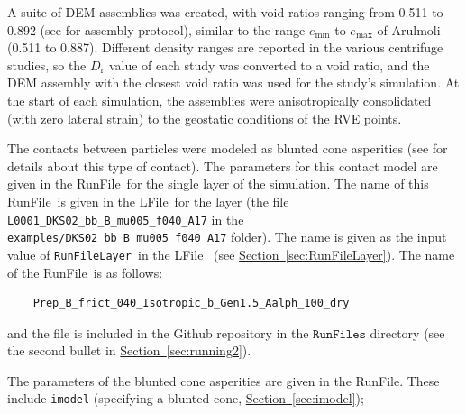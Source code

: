 \documentclass[letterpaper,11pt]{article}
\newcommand{\RunFile}{\textsf{RunFile}}
\newcommand{\LFile}{\textsf{LFile}}
\begin{document}
\par
A suite of DEM assemblies was created,
with void ratios ranging from 0.511 to 0.892
(see \cite{Kuhn:2020a} for assembly protocol),
similar to the range $e_{\text{min}}$ to $e_{\text{max}}$
of Arulmoli \cite{Arulmoli1992a} (0.511 to 0.887).
Different density ranges are reported in the various centrifuge studies,
so the $D_{\text{r}}$ value of each study was converted to
a void ratio, and the DEM assembly with the closest
void ratio was used for the study's simulation.
At the start of each simulation,
the assemblies were anisotropically consolidated
(with zero lateral strain)
to the geostatic conditions of the RVE points.
%
\par
The contacts between particles were modeled as blunted cone asperities
(see \cite{Kuhn:2011a,Kuhn:2014c,Kuhn:2018a} for details about
this type of contact).
The parameters for this contact model
are given in the \RunFile\ for the single layer of the
simulation.
The name of this \RunFile\ is given in the \LFile\ for the
layer (the file \texttt{L0001\_DKS02\_bb\_B\_mu005\_f040\_A17}
in the \texttt{examples/DKS02\_bb\_B\_mu005\_f040\_A17} folder).
The name is given as the input
value of \texttt{RunFileLayer}\ in the \LFile\ %
(see \hyperref[sec:RunFileLayer]{Section~\ref*{sec:RunFileLayer}}).
The name of the \RunFile\ is as follows:
\begin{verbatim}
	Prep_B_frict_040_Isotropic_b_Gen1.5_Aalph_100_dry
\end{verbatim}
and the file is included in the Github repository
in the $\texttt{RunFiles}$ directory
(see the second bullet in
\hyperref[sec:running2]{Section~\ref*{sec:running2}}).
\par
The parameters of the blunted cone asperities
are given in the \RunFile.
These include \texttt{imodel}
(specifying a blunted cone,
\hyperref[sec:imodel]{Section~\ref*{sec:imodel}});
\end{document}

